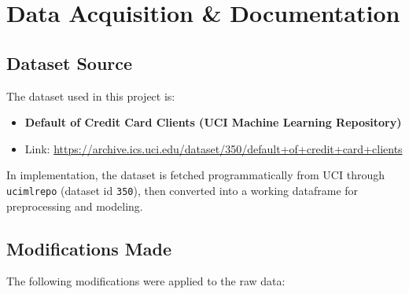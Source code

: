 \section{Data Acquisition \& Documentation}

\subsection{Dataset Source}
The dataset used in this project is:
\begin{itemize}
	\item \textbf{Default of Credit Card Clients (UCI Machine Learning Repository)}
	\item Link: \url{https://archive.ics.uci.edu/dataset/350/default+of+credit+card+clients}
\end{itemize}

In implementation, the dataset is fetched programmatically from UCI through \texttt{ucimlrepo} (dataset id \texttt{350}), then converted into a working dataframe for preprocessing and modeling.

\subsection{Modifications Made}
The following modifications were applied to the raw data:

